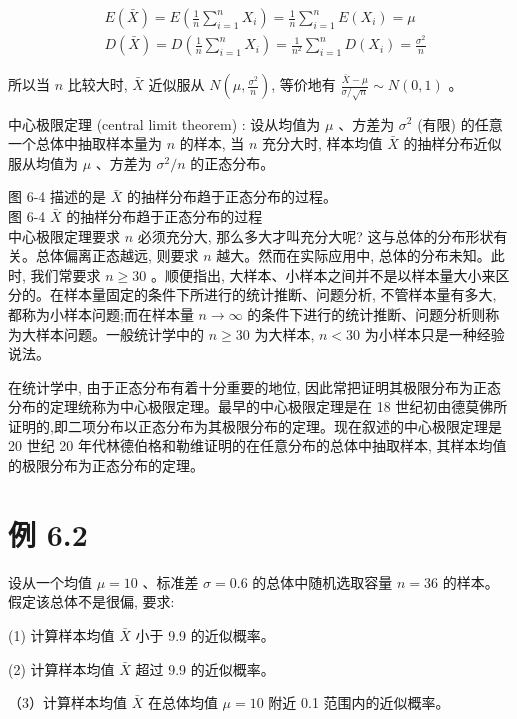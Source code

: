 \documentclass[10pt]{article}
\begin{document}
\begin{CJK*}{UTF8}{bsmi}
\begin{align*}
& E(\bar{X})=E\left(\frac{1}{n} \sum_{i=1}^{n} X_{i}\right)=\frac{1}{n} \sum_{i=1}^{n} E\left(X_{i}\right)=\mu  \tag{6.10}\\
& D(\bar{X})=D\left(\frac{1}{n} \sum_{i=1}^{n} X_{i}\right)=\frac{1}{n^{2}} \sum_{i=1}^{n} D\left(X_{i}\right)=\frac{\sigma^{2}}{n} \tag{6.11}
\end{align*}


所以当 $n$ 比较大时, $\bar{X}$ 近似服从 $N\left(\mu, \frac{\sigma^{2}}{n}\right)$, 等价地有 $\frac{\bar{X}-\mu}{\sigma / \sqrt{n}} \sim N(0,1)$ 。

中心极限定理 (central limit theorem) : 设从均值为 $\mu$ 、方差为 $\sigma^{2}$ (有限) 的任意一个总体中抽取样本量为 $n$ 的样本, 当 $n$ 充分大时, 样本均值 $\bar{X}$ 的抽样分布近似服从均值为 $\mu$ 、方差为 $\sigma^{2} / n$ 的正态分布。

图 6-4 描述的是 $\bar{X}$ 的抽样分布趋于正态分布的过程。\\

图 6-4 $\bar{X}$ 的抽样分布趋于正态分布的过程\\
中心极限定理要求 $n$ 必须充分大, 那么多大才叫充分大呢? 这与总体的分布形状有关。总体偏离正态越远, 则要求 $n$ 越大。然而在实际应用中, 总体的分布未知。此时, 我们常要求 $n \geqslant 30$ 。顺便指出, 大样本、小样本之间并不是以样本量大小来区分的。在样本量固定的条件下所进行的统计推断、问题分析, 不管样本量有多大, 都称为小样本问题;而在样本量 $n \rightarrow \infty$ 的条件下进行的统计推断、问题分析则称为大样本问题。一般统计学中的 $n \geqslant 30$ 为大样本, $n<30$ 为小样本只是一种经验说法。

在统计学中, 由于正态分布有着十分重要的地位, 因此常把证明其极限分布为正态分布的定理统称为中心极限定理。最早的中心极限定理是在 18 世纪初由德莫佛所证明的,即二项分布以正态分布为其极限分布的定理。现在叙述的中心极限定理是 20 世纪 20 年代林德伯格和勒维证明的在任意分布的总体中抽取样本, 其样本均值的极限分布为正态分布的定理。

\section*{例 6.2}
设从一个均值 $\mu=10$ 、标准差 $\sigma=0.6$ 的总体中随机选取容量 $n=36$ 的样本。假定该总体不是很偏, 要求:

(1) 计算样本均值 $\bar{X}$ 小于 9.9 的近似概率。

(2) 计算样本均值 $\bar{X}$ 超过 9.9 的近似概率。

（3）计算样本均值 $\bar{X}$ 在总体均值 $\mu=10$ 附近 0.1 范围内的近似概率。


\end{CJK*}
\end{document}

